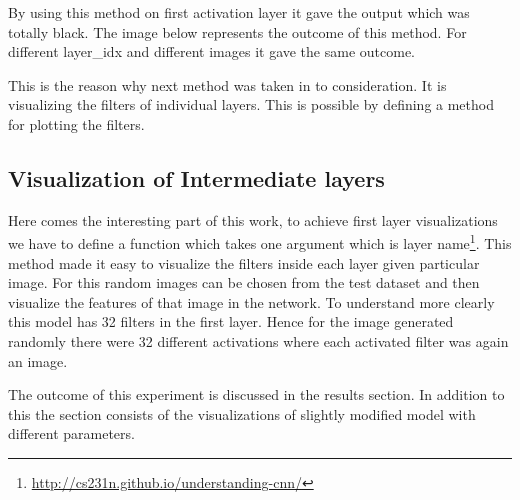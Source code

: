 \noindent By using this method on first activation layer it gave the output which was totally black. The image below represents the outcome of this method. For different layer\_idx and different images it gave the same outcome. 

\newpage \noindent This is the reason why next method was taken in to consideration. It is visualizing the filters of individual layers. This is possible by defining a method for plotting the filters. 

 \subsection{Visualization of Intermediate layers}

Here comes the interesting part of this work, to achieve first layer visualizations we have to define a function which takes one argument which is layer name\footnote{\url{http://cs231n.github.io/understanding-cnn/}}. This method made it easy to visualize the filters inside each layer given particular image. For this random images can be chosen from the test dataset and then visualize the features of that image in the network.
 To understand more clearly this model has 32 filters in the first layer. Hence for the image generated randomly there were 32 different activations where each activated filter was again an image. 
 
 
 The outcome of this experiment is discussed in the results section. In addition to this the section consists of the visualizations of slightly modified model with different parameters.  



    